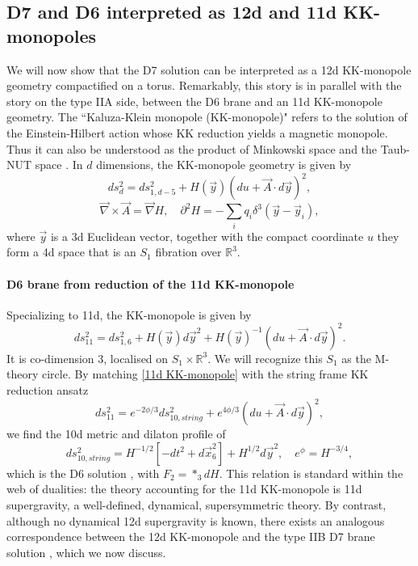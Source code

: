 \subsection{D7 and D6 interpreted as 12d and 11d KK-monopoles}
We will now show that the D7 solution can be interpreted as a 12d KK-monopole geometry compactified on a torus.
Remarkably, this story is in parallel with the story on the type IIA side, between the D6 brane and an 11d KK-monopole geometry.
The ``Kaluza-Klein monopole (KK-monopole)" \cite{Gross:1983hb,Sorkin:1983ns} refers to the solution of the Einstein-Hilbert action whose KK reduction yields a magnetic monopole.
Thus it can also be understood as the product of Minkowski space and the Taub-NUT space \cite{Ortin:2015hya}.
In $d$ dimensions, the KK-monopole geometry is given by
\cite{Eguchi:1980jx}
\begin{equation}
ds_d^2 = ds_{1,d-5}^2 + H(\vec{y})(du + \vec{A}\cdot d\vec{y})^2,
\label{d-dim KK-monopole}
\end{equation}
\begin{equation}
\vec{\nabla} \times \vec A = \vec\nabla H,\quad
\partial^2 H=-\sum_i q_i \delta^3(\vec{y}-\vec{y}_i),
\label{kk monopole einstein eqs}
\end{equation}
where $\vec{y}$ is a 3d Euclidean vector, together with the compact coordinate $u$ they form a 4d space that is an $S_1$ fibration over $\mathbb{R}^3$.

\paragraph{D6 brane from reduction of the 11d KK-monopole}
Specializing to 11d, the KK-monopole is given by
\begin{equation}
ds_{11}^2=ds_{1,6}^2 + H(\vec{y})d\vec{y}^2+H(\vec{y})^{-1}(du+\vec{A}\cdot d\vec{y})^2.
\label{11d KK-monopole}
\end{equation}
It is co-dimension 3, localised on $S_1\times\mathbb{R}^3$. 
We will recognize this $S_1$ as the M-theory circle.
By matching \eqref{11d KK-monopole} with the string frame KK reduction ansatz
\begin{equation}
ds_{11}^2=e^{-2\phi/3}ds_{10,string}^2+e^{4\phi/3}(du+ \vec{A}\cdot d\vec{y})^2,
\label{string frame KK reduction ansatz}
\end{equation}
we find the 10d metric and dilaton profile of
\begin{equation}
ds_{10,string}^2=H^{-1/2}[-dt^2+d\vec{x}_6^2] + H^{1/2}d\vec{y}^2,\quad
e^\phi=H^{-3/4},
\end{equation}
which is the D6 solution \cite{Horowitz:1991cd,Townsend:1995kk}, with $F_2=*_3 dH$.
This relation is standard within the web of dualities: the theory accounting for the 11d KK-monopole is 11d supergravity, a well-defined, dynamical, supersymmetric theory.
By contrast, although no dynamical 12d supergravity is known, there exists an analogous correspondence between the 12d KK-monopole and the type IIB D7 brane solution \cite{Tseytlin:1996ne}, which we now discuss.


